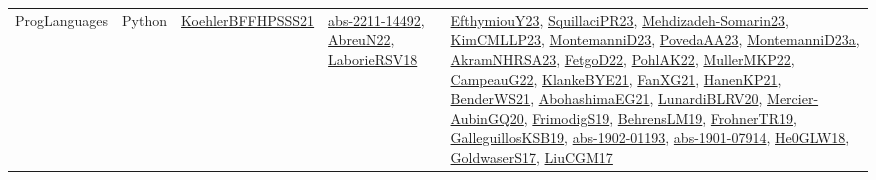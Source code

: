 {\begin{longtable}{lp{3cm}>{\raggedright}p{6cm}>{\raggedright}p{6cm}p{8cm}}
ProgLanguages & Python & \href{articles/KoehlerBFFHPSSS21.pdf}{KoehlerBFFHPSSS21}\cite{KoehlerBFFHPSSS21} & \href{articles/abs-2211-14492.pdf}{abs-2211-14492}\cite{abs-2211-14492}, \href{articles/AbreuN22.pdf}{AbreuN22}\cite{AbreuN22}, \href{articles/LaborieRSV18.pdf}{LaborieRSV18}\cite{LaborieRSV18} & \href{papers/EfthymiouY23.pdf}{EfthymiouY23}\cite{EfthymiouY23}, \href{papers/SquillaciPR23.pdf}{SquillaciPR23}\cite{SquillaciPR23}, \href{papers/Mehdizadeh-Somarin23.pdf}{Mehdizadeh-Somarin23}\cite{Mehdizadeh-Somarin23}, \href{papers/KimCMLLP23.pdf}{KimCMLLP23}\cite{KimCMLLP23}, \href{articles/MontemanniD23.pdf}{MontemanniD23}\cite{MontemanniD23}, \href{papers/PovedaAA23.pdf}{PovedaAA23}\cite{PovedaAA23}, \href{articles/MontemanniD23a.pdf}{MontemanniD23a}\cite{MontemanniD23a}, \href{articles/AkramNHRSA23.pdf}{AkramNHRSA23}\cite{AkramNHRSA23}, \href{articles/FetgoD22.pdf}{FetgoD22}\cite{FetgoD22}, \href{articles/PohlAK22.pdf}{PohlAK22}\cite{PohlAK22}, \href{articles/MullerMKP22.pdf}{MullerMKP22}\cite{MullerMKP22}, \href{articles/CampeauG22.pdf}{CampeauG22}\cite{CampeauG22}, \href{papers/KlankeBYE21.pdf}{KlankeBYE21}\cite{KlankeBYE21}, \href{articles/FanXG21.pdf}{FanXG21}\cite{FanXG21}, \href{papers/HanenKP21.pdf}{HanenKP21}\cite{HanenKP21}, \href{papers/BenderWS21.pdf}{BenderWS21}\cite{BenderWS21}, \href{articles/AbohashimaEG21.pdf}{AbohashimaEG21}\cite{AbohashimaEG21}, \href{articles/LunardiBLRV20.pdf}{LunardiBLRV20}\cite{LunardiBLRV20}, \href{papers/Mercier-AubinGQ20.pdf}{Mercier-AubinGQ20}\cite{Mercier-AubinGQ20}, \href{papers/FrimodigS19.pdf}{FrimodigS19}\cite{FrimodigS19}, \href{papers/BehrensLM19.pdf}{BehrensLM19}\cite{BehrensLM19}, \href{papers/FrohnerTR19.pdf}{FrohnerTR19}\cite{FrohnerTR19}, \href{papers/GalleguillosKSB19.pdf}{GalleguillosKSB19}\cite{GalleguillosKSB19}, \href{articles/abs-1902-01193.pdf}{abs-1902-01193}\cite{abs-1902-01193}, \href{articles/abs-1901-07914.pdf}{abs-1901-07914}\cite{abs-1901-07914}, \href{papers/He0GLW18.pdf}{He0GLW18}\cite{He0GLW18}, \href{papers/GoldwaserS17.pdf}{GoldwaserS17}\cite{GoldwaserS17}, \href{papers/LiuCGM17.pdf}{LiuCGM17}\cite{LiuCGM17}\\

\end{longtable}}
